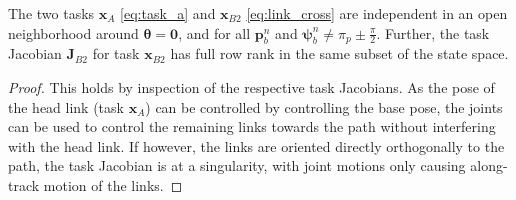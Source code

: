 \documentclass[../main.tex]{subfiles}
\begin{document}
\begin{proposition}
    \label{prop:independent_B2}
The two tasks $\bm{x}_A$ \eqref{eq:task_a} and $\bm{x}_{B2}$ \eqref{eq:link_cross} are independent in an open neighborhood around $\bm{\theta} = \bm{0}$, and for all $\bm{p}^n_b$ and $\bm{\psi}^n_b \neq \pi_p \pm \frac{\pi}{2}$. Further, the task Jacobian $\bm{J}_{B2}$ for task $\bm{x}_{B2}$ has full row rank in the same subset of the state space.
\end{proposition}
\begin{proof}
    This holds by inspection of the respective task Jacobians. As the pose of the head link (task $\bm{x}_A$) can be controlled by controlling the base pose, the joints can be used to control the remaining links towards the path without interfering with the head link. If however, the links are oriented directly orthogonally to the path, the task Jacobian is at a singularity, with joint motions only causing along-track motion of the links.
\end{proof}
\end{document}
